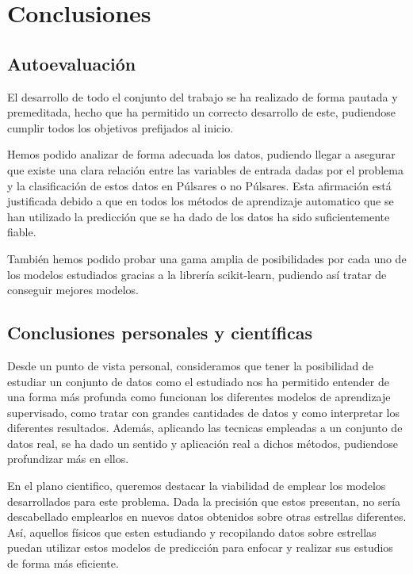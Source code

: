 \documentclass[a4paper]{article} %
\begin{document}

\section{Conclusiones}

\subsection{Autoevaluación}
El desarrollo de todo el conjunto del trabajo se ha realizado de forma pautada y premeditada, hecho que ha permitido un correcto desarrollo de este, pudiendose cumplir todos los objetivos prefijados al inicio.\vspace{5mm}

Hemos podido analizar de forma adecuada los datos, pudiendo llegar a asegurar que existe una clara relación entre las variables de entrada dadas por el problema y la clasificación de estos datos en Púlsares o no Púlsares. Esta afirmación está justificada debido a que en todos los métodos de aprendizaje automatico que se han utilizado la predicción que se ha dado de los datos ha sido suficientemente fiable.\vspace{5mm}

También hemos podido probar una gama amplia de posibilidades por cada uno de los modelos estudiados gracias a la librería scikit-learn, pudiendo así tratar de conseguir mejores modelos.

\subsection{Conclusiones personales y científicas}
Desde un punto de vista personal, consideramos que tener la posibilidad de estudiar un conjunto de datos como el estudiado nos ha permitido entender de una forma más profunda como funcionan los diferentes modelos de aprendizaje supervisado, como tratar con grandes cantidades de datos y como interpretar los diferentes resultados. Además, aplicando las tecnicas empleadas a un conjunto de datos real, se ha dado un sentido y aplicación real a dichos métodos, pudiendose profundizar más en ellos.\vspace{5mm}

En el plano cientifico, queremos destacar la viabilidad de emplear los modelos desarrollados  para este problema. Dada la precisión que estos presentan, no sería descabellado emplearlos en nuevos datos obtenidos sobre otras estrellas diferentes. Así, aquellos físicos que esten estudiando y recopilando datos sobre estrellas puedan utilizar estos modelos de predicción para enfocar y realizar sus estudios de forma más eficiente.
\end{document}

